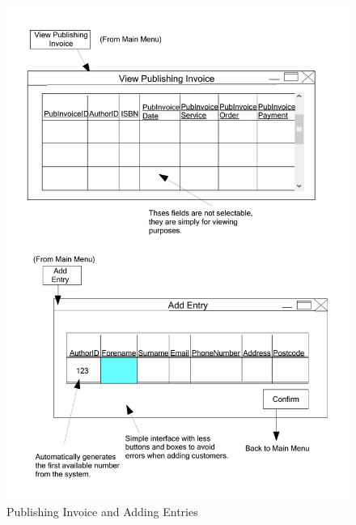 \begin{figure}[H]
    \caption{Publishing Invoice and Adding Entries} \label{PubInvoice_and_Add_Entry.pdf}
    \includegraphics[width=\textwidth]{./Design/UserInterfaceDesign/PubInvoice_and_Add_Entry.pdf}
\end{figure}

